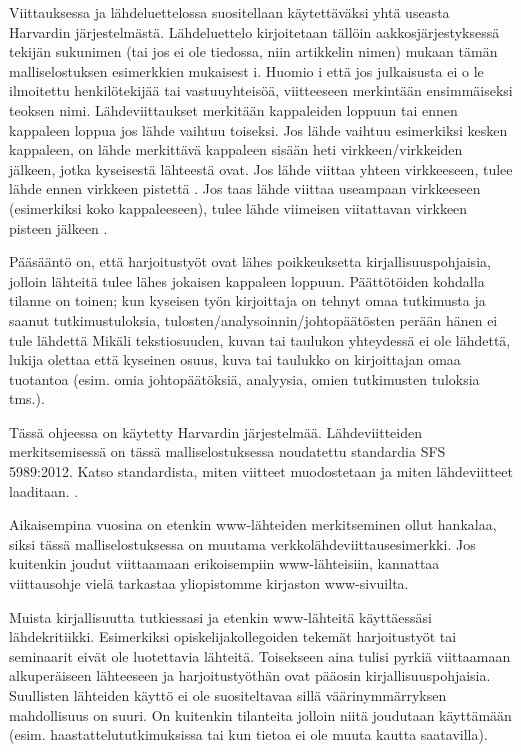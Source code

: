 \documentclass{LUT_pohja}[2016/03/09 LUT Dippa Pohja]
\begin{document}
Viittauksessa ja lähdeluettelossa suositellaan käytettäväksi yhtä useasta Harvardin 
järjestelmästä. Lähdeluettelo kirjoitetaan tällöin aakkosjärjestyksessä tekijän sukunimen (tai jos ei ole tiedossa, niin artikkelin nimen) mukaan tämän malliselostuksen esimerkkien mukaisest i. Huomio i että jos julkaisusta ei o le ilmoitettu henkilötekijää tai vastuuyhteisöä, 
viitteeseen  merkintään  ensimmäiseksi  teoksen  nimi.  Lähdeviittaukset  merkitään 
kappaleiden loppuun tai ennen kappaleen loppua jos lähde vaihtuu toiseksi. Jos lähde 
vaihtuu esimerkiksi kesken kappaleen, on lähde merkittävä kappaleen sisään heti 
virkkeen/virkkeiden jälkeen, jotka kyseisestä lähteestä ovat. \citep[s. 14.]{Kauppinen01b} Jos lähde viittaa yhteen virkkeeseen, tulee lähde ennen virkkeen pistettä \citep[s. 36.]{Kauppinen01a}. Jos taas lähde viittaa useampaan virkkeeseen 
(esimerkiksi koko kappaleeseen), tulee lähde viimeisen viitattavan virkkeen pisteen jälkeen \citep[s. 30.]{Kauppinen01b}.\par

Pääsääntö on, että harjoitustyöt ovat lähes poikkeuksetta kirjallisuuspohjaisia, jolloin 
lähteitä tulee lähes jokaisen kappaleen loppuun. Päättötöiden kohdalla tilanne on toinen; kun kyseisen työn kirjoittaja on tehnyt omaa tutkimusta ja saanut tutkimustuloksia, tulosten/analysoinnin/johtopäätösten perään  hänen ei tule  lähdettä \citep[s. 30.]{Kauppinen01b} Mikäli tekstiosuuden, kuvan tai taulukon yhteydessä ei ole 
lähdettä, lukija olettaa että kyseinen osuus, kuva tai taulukko on kirjoittajan omaa tuotantoa (esim. omia johtopäätöksiä, analyysia, omien tutkimusten tuloksia tms.).\par

Tässä ohjeessa on käytetty Harvardin järjestelmää. Lähdeviitteiden merkitsemisessä on 
tässä malliselostuksessa noudatettu standardia SFS 5989:2012. Katso standardista, miten 
viitteet muodostetaan ja miten lähdeviitteet laaditaan. \citeauthor{SFS12}.

Aikaisempina vuosina on etenkin www-lähteiden merkitseminen ollut hankalaa, siksi tässä 
malliselostuksessa on  muutama  verkkolähdeviittausesimerkki.  Jos kuitenkin  joudut 
viittaamaan  erikoisempiin  www-lähteisiin,  kannattaa  viittausohje  vielä  tarkastaa 
yliopistomme kirjaston www-sivuilta. \citep{Viittaaminen07}

Muista kirjallisuutta tutkiessasi ja  etenkin www-lähteitä käyttäessäsi lähdekritiikki. 
Esimerkiksi opiskelijakollegoiden tekemät harjoitustyöt tai seminaarit eivät ole luotettavia 
lähteitä.  Toisekseen aina tulisi pyrkiä  viittaamaan alkuperäiseen lähteeseen ja 
harjoitustyöthän ovat pääosin kirjallisuuspohjaisia. Suullisten lähteiden käyttö ei ole 
suositeltavaa sillä väärinymmärryksen mahdollisuus on suuri. On kuitenkin tilanteita 
jolloin niitä joudutaan käyttämään (esim. haastattelututkimuksissa tai kun tietoa ei ole 
muuta kautta saatavilla). \cite{Pakkanen05}
\end{document}
